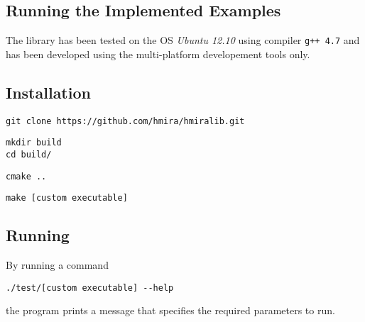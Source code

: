 \begin{appendices}

\chapter{Running the Implemented Examples}

The library has been tested on the OS \emph{Ubuntu 12.10} using compiler \texttt{g++ 4.7}
and has been developed using the multi-platform developement tools only.



\section{Installation}

\begin{lstlisting}
git clone https://github.com/hmira/hmiralib.git
\end{lstlisting}

\begin{lstlisting}
mkdir build
cd build/
\end{lstlisting}

\begin{lstlisting}
cmake ..
\end{lstlisting}

\begin{lstlisting}
make [custom executable]
\end{lstlisting}

\section{Running}

By running a command

\begin{lstlisting}
./test/[custom executable] --help
\end{lstlisting}
the program prints a message that specifies the required parameters to run.


\end{appendices}
